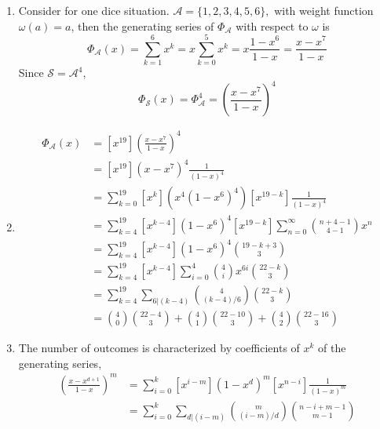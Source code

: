 \begin{enumerate}
    \newpage
    
\begin{enumerate}
    \item Consider for one dice situation. $\mathcal{A} = \{1,2,3,4,5,6\} , $ with weight function $\omega(a) = a$, then the generating series of $\Phi_{\mathcal{A}}$ with respect to $\omega$ is $$\Phi_{\mathcal{A}}(x) = \sum_{k=1}^6 x^k = x \sum_{k=0}^5 x^k = x\frac{1-x^6}{1-x} = \frac{x-x^7}{1-x}$$
    Since $ \mathscr{S}= \mathcal{A}^4$,
    $$
    \Phi_\mathscr{S}(x) = \Phi_\mathcal{A}^4 = (\frac{x-x^7}{1-x})^4
    $$
    \item  
\begin{align*}
 [x^{19}]\Phi_\mathcal{A}(x) &= [x^{19}] (\frac{x-x^7}{1-x})^4 \\
 &= [x^{19}](x-x^7)^4 \frac{1}{(1-x)^4}   \\
 &= \sum_{k=0}^{19} [x^k]\left(x^4(1-x^6)^4\right) [x^{19-k}]\frac{1}{(1-x)^4}\\
 &= \sum_{k=4}^{19}[x^{k-4}](1-x^6)^4 [x^{19-k}]\sum_{n=0}^{\infty} \binom{n + 4 - 1}{4-1} x^n \\
 &= \sum_{k=4}^{19}[x^{k-4}](1-x^6)^4 \binom{19-k + 3}{3} \\
 &= \sum_{k=4}^{19} [x^{k-4}]\sum_{i=0}^4\binom{4}{i}x^{6i} \binom{22-k}{3} \\
 &= \sum_{k=4}^{19} \sum_{6 | (k-4)} \binom{4}{(k-4)/6} \binom{22-k}{3} \\
 & = \binom{4}{0} \binom{22-4}{3} + \binom{4}{1} \binom{22-10}{3} + \binom{4}{2} \binom{22-16}{3}
\end{align*}
 \item The number of outcomes is characterized by coefficients of $x^k$ of the generating series,
 \begin{align*}   
 [x^k]\left(\frac{x-x^{d+1}}{1-x}\right)^m &= \sum_{i=0}^{k} [x^{i-m}](1-x^d)^m [x^{n-i}]\frac{1}{(1-x)^m}\\
 &= \sum_{i=0}^k \sum_{d|(i-m)}\binom{m}{(i-m)/d}\binom{n-i+m-1}{m-1}
 \end{align*}
 

\end{enumerate}
    \newpage
    

\end{enumerate}
